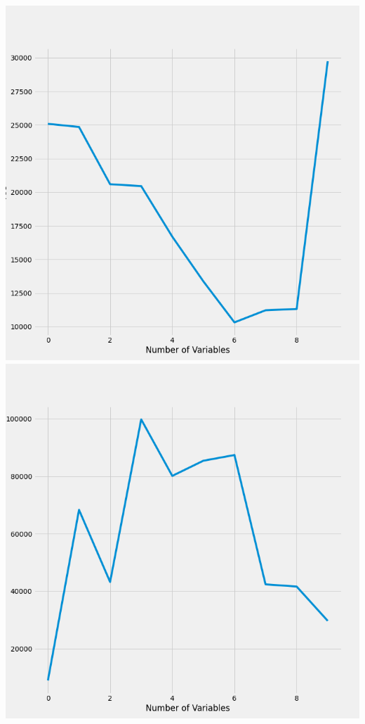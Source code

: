 \documentclass{article}
\begin{document}
	\includegraphics[scale = 0.2]{../plots/python/AICAutoForward4L.png} 
	\includegraphics[scale = 0.2]{../plots/python/AICBackward4L.png}
\end{document}
